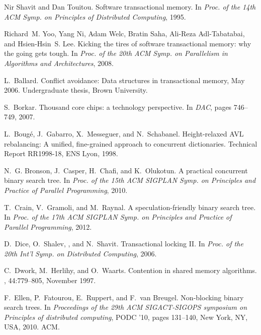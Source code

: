 \begin{thebibliography}{99}
{
Nir Shavit and Dan Touitou.
\newblock Software transactional memory.
\newblock In {\em Proc. of the 14th ACM Symp. on Principles of Distributed
  Computing}, 1995.

Richard~M. Yoo, Yang Ni, Adam Welc, Bratin Saha, Ali-Reza Adl-Tabatabai, and
  Hsien-Hsin~S. Lee.
\newblock Kicking the tires of software transactional memory: why the going
  gets tough.
\newblock In {\em Proc. of the 20th ACM Symp. on Parallelism in Algorithms and
  Architectures}, 2008.







L.~Ballard.
\newblock Conflict avoidance: Data structures in transactional memory, May
  2006.
\newblock Undergraduate thesis, Brown University.

S.~Borkar.
\newblock Thousand core chips: a technology perspective.
\newblock In {\em DAC}, pages 746--749, 2007.

L.~Boug\'e, J.~Gabarro, X.~Messeguer, and N.~Schabanel.
\newblock Height-relaxed {AVL} rebalancing: A unified, fine-grained approach to
  concurrent dictionaries.
\newblock Technical Report RR1998-18, ENS Lyon, 1998.

N.~G. Bronson, J.~Casper, H.~Chafi, and K.~Olukotun.
\newblock A practical concurrent binary search tree.
\newblock In {\em Proc. of the 15th ACM SIGPLAN Symp. on Principles and
  Practice of Parallel Programming}, 2010.

T.~Crain, V.~Gramoli, and M.~Raynal.
\newblock A speculation-friendly binary search tree.
\newblock In {\em Proc. of the 17th ACM SIGPLAN Symp. on Principles and
  Practice of Parallel Programming}, 2012.

D.~Dice, O.~Shalev, , and N.~Shavit.
\newblock Transactional locking {II}.
\newblock In {\em Proc. of the 20th Int'l Symp. on Distributed Computing},
  2006.

C.~Dwork, M.~Herlihy, and O.~Waarts.
\newblock Contention in shared memory algorithms.
, 44:779--805, November 1997.

F.~Ellen, P.~Fatourou, E.~Ruppert, and F.~van Breugel.
\newblock Non-blocking binary search trees.
\newblock In {\em Proceedings of the 29th ACM SIGACT-SIGOPS symposium on
  Principles of distributed computing}, PODC '10, pages 131--140, New York, NY,
  USA, 2010. ACM.

}
\end{thebibliography}
